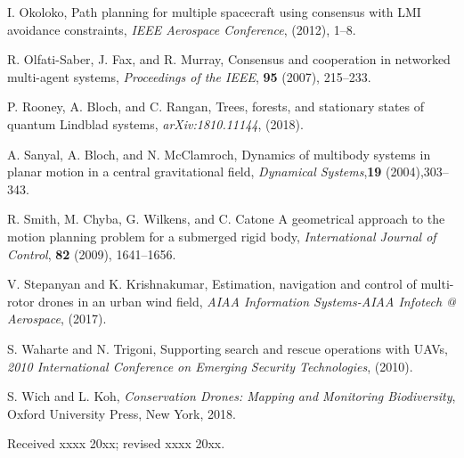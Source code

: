 \documentclass{aims}
\theoremstyle{definition}
\begin{document}
\begin{thebibliography}{99}
    \newblock I. Okoloko,
    \newblock Path planning for multiple spacecraft using consensus with LMI avoidance constraints,
    \newblock \emph{IEEE Aerospace Conference}, (2012), 1--8.

    \newblock R. Olfati-Saber, J. Fax, and R. Murray,
    \newblock Consensus and cooperation in networked multi-agent systems,
    \newblock \emph{Proceedings of the IEEE}, \textbf{95} (2007), 215--233.

    \newblock P. Rooney, A. Bloch, and C. Rangan,
    \newblock Trees, forests, and stationary states of quantum Lindblad systems,
    \newblock \emph{arXiv:1810.11144}, (2018).

    \newblock A. Sanyal, A. Bloch, and N. McClamroch,
    \newblock Dynamics of multibody systems in planar motion in a central gravitational field,
    \newblock \emph{Dynamical Systems},\textbf{19} (2004),303--343.

     \newblock  R. Smith,  M. Chyba, G. Wilkens, and C. Catone
     \newblock A geometrical approach to the motion planning problem for a submerged rigid body,
     \newblock \emph{International Journal of Control}, \textbf{82} (2009), 1641--1656.   

     \newblock  V. Stepanyan and K. Krishnakumar, 
     \newblock Estimation, navigation and control of multi-rotor drones in an urban wind field,
     \newblock \emph{AIAA Information Systems-AIAA Infotech @ Aerospace}, (2017).

    \newblock S. Waharte and N. Trigoni,
    \newblock Supporting search and rescue operations with UAVs,
    \newblock \emph{2010 International Conference on Emerging Security Technologies}, (2010).

     \newblock S. Wich and L. Koh,
     \newblock \emph{Conservation Drones: Mapping and Monitoring Biodiversity},
     \newblock Oxford University Press, New York, 2018. 
     

    

    
    
    

    

    

\end{thebibliography}


\medskip
Received xxxx 20xx; revised xxxx 20xx.
\medskip
\end{document}
